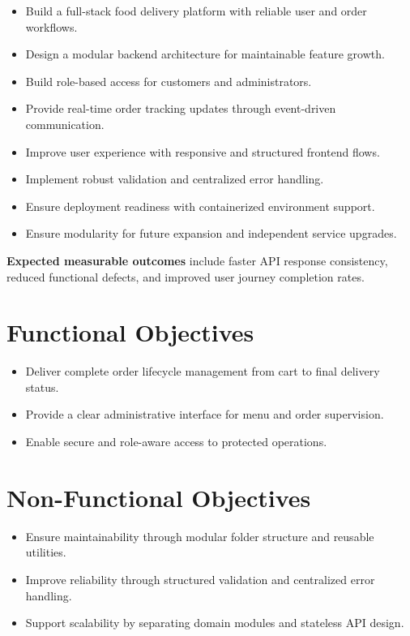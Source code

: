 \documentclass[12pt,a4paper]{report}
\begin{document}
\begin{itemize}
    \item Build a full-stack food delivery platform with reliable user and order workflows.
    \item Design a modular backend architecture for maintainable feature growth.
    \item Build role-based access for customers and administrators.
    \item Provide real-time order tracking updates through event-driven communication.
    \item Improve user experience with responsive and structured frontend flows.
    \item Implement robust validation and centralized error handling.
    \item Ensure deployment readiness with containerized environment support.
    \item Ensure modularity for future expansion and independent service upgrades.
\end{itemize}

\textbf{Expected measurable outcomes} include faster API response consistency, reduced functional defects, and improved user journey completion rates.

\section{Functional Objectives}
\begin{itemize}
    \item Deliver complete order lifecycle management from cart to final delivery status.
    \item Provide a clear administrative interface for menu and order supervision.
    \item Enable secure and role-aware access to protected operations.
\end{itemize}

\section{Non-Functional Objectives}
\begin{itemize}
    \item Ensure maintainability through modular folder structure and reusable utilities.
    \item Improve reliability through structured validation and centralized error handling.
    \item Support scalability by separating domain modules and stateless API design.
\end{itemize}
\end{document}
